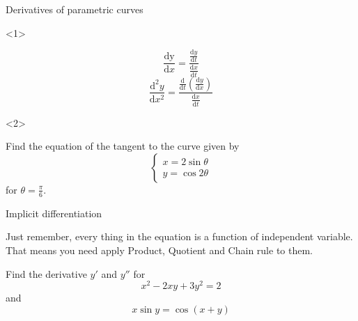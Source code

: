 \begin{frame}{Derivatives of parametric curves}

\begin{onlyenv}<1>


\[
\frac{\mathrm{dy}}{\mathrm{d}x}=\frac{\frac{\mathrm{d}y}{\mathrm{d}t}}{\frac{\mathrm{d}x}{\mathrm{d}t}}
\]
\[
\frac{\mathrm{d}^{2}y}{\mathrm{d}x^{2}}=\frac{\frac{\mathrm{d}}{\mathrm{d}t}\left(\frac{\mathrm{d}y}{\mathrm{d}x}\right)}{\frac{\mathrm{d}x}{\mathrm{d}t}}
\]


\end{onlyenv}



\begin{onlyenv}<2>

\begin{example}
Find the equation of the tangent to the curve given by
\[
\begin{cases}
x=2\sin\theta\\
y=\cos2\theta
\end{cases}
\]
for $\theta=\frac{\pi}{6}$.


\end{example}

\end{onlyenv}

\end{frame}

\begin{frame}{Implicit differentiation}


\alert{Just remember, every thing in the equation is a function of independent
variable. That means you need apply Product, Quotient and Chain rule
to them.}
\begin{example}
Find the derivative $y'$ and $y''$ for
\[
x^{2}-2xy+3y^{2}=2
\]
and
\[
x\sin y=\cos\left(x+y\right)
\]



\end{example}

\end{frame}

